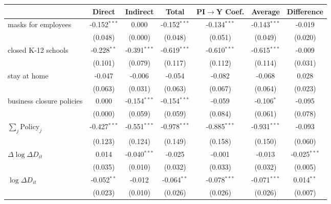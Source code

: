
\begin{tabular}{lccccc|>{}c}
\toprule
  & Direct & Indirect & Total & PI$\to$Y Coef. & Average & Difference\\
\midrule
masks for employees & -0.152$^{***}$ & 0.000 & -0.152$^{***}$ & -0.134$^{***}$ & -0.143$^{***}$ & -0.019\\
 & (0.048) & (0.000) & (0.048) & (0.051) & (0.049) & (0.020)\\
closed K-12 schools & -0.228$^{**}$ & -0.391$^{***}$ & -0.619$^{***}$ & -0.610$^{***}$ & -0.615$^{***}$ & -0.009\\
 & (0.101) & (0.079) & (0.117) & (0.112) & (0.114) & (0.031)\\
stay at home & -0.047 & -0.006 & -0.054 & -0.082 & -0.068 & 0.028\\
 & (0.063) & (0.031) & (0.063) & (0.067) & (0.064) & (0.023)\\
business closure policies & 0.000 & -0.154$^{***}$ & -0.154$^{***}$ & -0.059 & -0.106$^{*}$ & -0.095\\
 & (0.000) & (0.059) & (0.059) & (0.084) & (0.061) & (0.078)\\
$\sum_j \mathrm{Policy}_j$ & -0.427$^{***}$ & -0.551$^{***}$ & -0.978$^{***}$ & -0.885$^{***}$ & -0.931$^{***}$ & -0.093\\
 & (0.123) & (0.124) & (0.149) & (0.158) & (0.150) & (0.060)\\
$\Delta \log \Delta D_{it}$ & 0.014 & -0.040$^{***}$ & -0.025 & -0.001 & -0.013 & -0.025$^{***}$\\
 & (0.035) & (0.010) & (0.032) & (0.033) & (0.032) & (0.005)\\
$\log \Delta D_{it}$ & -0.052$^{**}$ & -0.012 & -0.064$^{**}$ & -0.078$^{***}$ & -0.071$^{***}$ & 0.014$^{**}$\\
 & (0.023) & (0.010) & (0.026) & (0.026) & (0.026) & (0.007)\\
\bottomrule
\end{tabular}